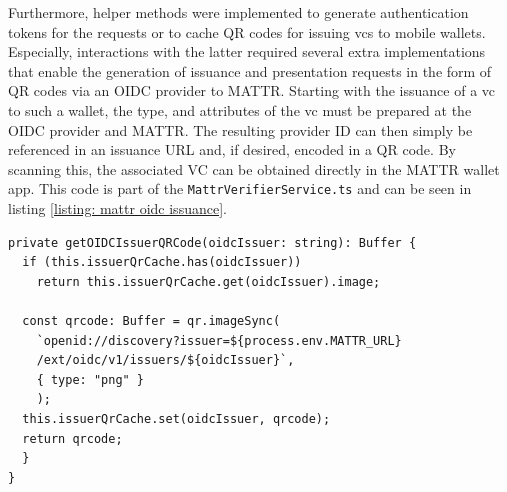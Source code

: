     Furthermore, helper methods were implemented to generate authentication tokens for the requests or to cache QR codes for issuing \acp{vc} to mobile wallets. Especially, interactions with the latter required several extra implementations that enable the generation of issuance and presentation requests in the form of QR codes via an OIDC provider to MATTR. Starting with the issuance of a \ac{vc} to such a wallet, the type, and attributes of the \ac{vc} must be prepared at the OIDC provider and MATTR. The resulting provider ID can then simply be referenced in an issuance URL and, if desired, encoded in a QR code. By scanning this, the associated VC can be obtained directly in the MATTR wallet app. This code is part of the \texttt{MattrVerifierService.ts} and can be seen in listing \ref{listing: mattr oidc issuance}.
    \newline
    
\begin{lstlisting}[style=ES6, caption=OIDC issuance QR code generation, label={listing: mattr oidc issuance}]
private getOIDCIssuerQRCode(oidcIssuer: string): Buffer {
  if (this.issuerQrCache.has(oidcIssuer)) 
    return this.issuerQrCache.get(oidcIssuer).image;

  const qrcode: Buffer = qr.imageSync(
    `openid://discovery?issuer=${process.env.MATTR_URL}
    /ext/oidc/v1/issuers/${oidcIssuer}`,
    { type: "png" }
    );
  this.issuerQrCache.set(oidcIssuer, qrcode);
  return qrcode;
  }
}\end{lstlisting}

